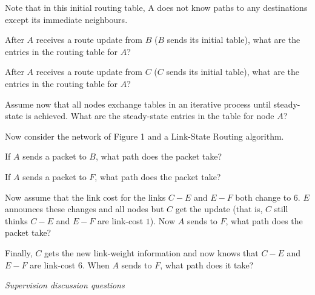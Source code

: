 \documentclass{supervision}
\begin{document}
\begin{questions}
\begin{parts}
            Note that in this initial routing table, A does not know paths
            to any destinations except its immediate neighbours.

            \begin{subparts}
              \subpart After $A$ receives a route update from $B$ ($B$ sends
                its initial table), what are the entries in the routing table
                for $A$?

              \subpart After $A$ receives a route update from $C$ ($C$ sends
                its initial table), what are the entries in the routing table
                for $A$?

              \subpart Assume now that all nodes exchange tables in an
                iterative process until steady-state is achieved. What are the
                steady-state entries in the table for node $A$?
            \end{subparts}

            Now consider the network of Figure 1 and a Link-State Routing
            algorithm.

            \begin{subparts}
              \subpart If $A$ sends a packet to $B$, what path does the packet
                take?

              \subpart If $A$ sends a packet to $F$, what path does the packet
                take?

              \subpart Now assume that the link cost for the links $C-E$ and
                $E-F$ both change to $6$. $E$ announces these changes and all
                nodes but $C$ get the update (that is, $C$ still thinks $C-E$
                and $E-F$ are link-cost $1$). Now $A$ sends to $F$, what path
                does the packet take?

              \subpart Finally, $C$ gets the new link-weight information and
                now knows that $C-E$ and $E-F$ are link-cost $6$. When $A$
                sends to $F$, what path does it take?

            \end{subparts}
        \end{parts}
      \question \textit{Supervision discussion questions}
\end{questions}
\end{document}
